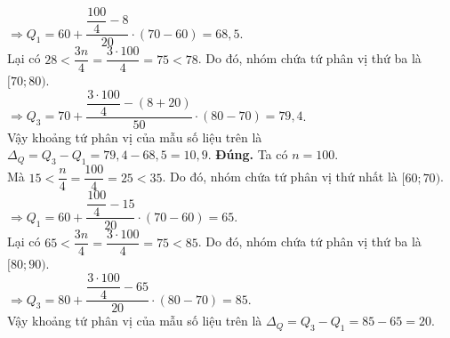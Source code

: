 \begin{ex}
{\begin{itemchoice}
		$\Rightarrow Q_1=60+\dfrac{\dfrac{100}{4}-8}{20} \cdot (70-60)=68{,}5$.\\
		Lại có $28<\dfrac{3n}{4}=\dfrac{3 \cdot 100}{4}=75<78$. Do đó, nhóm chứa tứ phân vị thứ ba là $[70;80)$.\\
		$\Rightarrow Q_3=70+\dfrac{\dfrac{3 \cdot 100}{4}-(8+20)}{50} \cdot(80-70)=79{,}4$.\\
		Vậy khoảng tứ phân vị của mẫu số liệu trên là $\Delta_Q=Q_3-Q_1=79{,}4-68{,}5=10{,}9$.
		\itemch \textbf{Đúng.} Ta có $n=100$.\\
		Mà $15<\dfrac{n}{4}=\dfrac{100}{4}=25<35$. Do đó, nhóm chứa tứ phân vị thứ nhất là $[60;70)$.\\
		$\Rightarrow Q_1=60+\dfrac{\dfrac{100}{4}-15}{20} \cdot(70-60)=65$.\\
		Lại có $65<\dfrac{3n}{4}=\dfrac{3 \cdot 100}{4}=75<85$. Do đó, nhóm chứa tứ phân vị thứ ba là $[80;90)$.\\
		$\Rightarrow Q_3=80+\dfrac{\dfrac{3 \cdot 100}{4}-65}{20} \cdot(80-70)=85$.\\
		Vậy khoảng tứ phân vị của mẫu số liệu trên là $\Delta_Q=Q_3-Q_1=85-65=20$.
	\end{itemchoice}
}
\end{ex}


